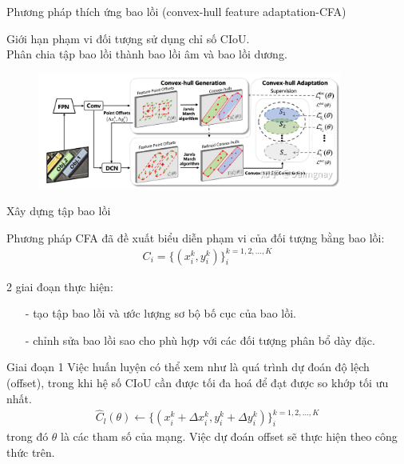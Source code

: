 \documentclass[11pt]{beamer}
\theoremstyle{definition}
\theoremstyle{plain}
\theoremstyle{plain}
\theoremstyle{remark}
\begin{document}
	\begin{frame}{Phương pháp thích ứng bao lồi (convex-hull feature adaptation-CFA)}
	 
	 Giới hạn phạm vi đối tượng sử dụng chỉ số CIoU.\\
	 Phân chia tập bao lồi thành bao lồi âm và bao lồi dương.
		\begin{figure}[htp]
			\begin{center}
				\includegraphics[width=10cm]{./Hinh_1.jpg}
			\end{center}
		\end{figure}
	\end{frame}
	\begin{frame}{Xây dựng tập bao lồi}
		
		Phương pháp CFA đã đề xuất biểu diễn phạm
		vi của đối tượng bằng bao lồi:\\
		\begin{align} \label{ptdd}
			C_i = \{(x_i^k, y_i^k )\}_i^{k=1,2,...,K}
		\end{align}
		
	
		
	\end{frame}
	\begin{frame}{2 giai đoạn thực hiện:}
		\begin{itemize}
			\item[-] tạo tập bao lồi và ước lượng sơ bộ bố cục của bao lồi.
			
			\item[-] chỉnh sửa bao lồi sao cho phù hợp với các đối tượng phân bổ dày đặc.
			
		\end{itemize}
	\end{frame}
	
	
	\begin{frame}{Giai đoạn 1}
		Việc huấn luyện có thể xem như là quá trình dự đoán độ lệch (offset), trong
		khi hệ số CIoU cần được tối đa hoá để đạt được so khớp tối ưu nhất.
		\begin{align} \label{ptdd}
			\widehat C_l (\theta) \gets \{(x_i^k + \Delta x_i^k, y_i^k + \Delta y_i^k )\}_i^{k=1,2,...,K}
		\end{align}
		trong đó $\theta$ là các tham số của mạng. Việc dự đoán offset sẽ thực
		hiện theo công thức trên.
	\end{frame}
	
\end{document}
